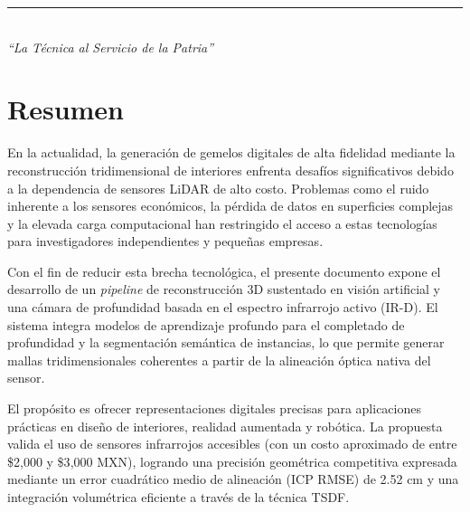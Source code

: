 \documentclass[12pt, a4, twoside, openany]{report}
\begin{document}

\vspace{1cm}

\begin{center}
    \textcolor{guindaIPN}{\rule{12cm}{0.8mm}}\\
    \Large
    \textcolor{guindaIPN}{\textit{``La Técnica al Servicio de la Patria''}}
\end{center}
\justify


\setcounter{page}{1}


\chapter*{Resumen}

En la actualidad, la generación de gemelos digitales de alta fidelidad mediante la reconstrucción tridimensional de interiores enfrenta desafíos significativos debido a la dependencia de sensores LiDAR de alto costo. Problemas como el ruido inherente a los sensores económicos, la pérdida de datos en superficies complejas y la elevada carga computacional han restringido el acceso a estas tecnologías para investigadores independientes y pequeñas empresas.

Con el fin de reducir esta brecha tecnológica, el presente documento expone el desarrollo de un \textit{pipeline} de reconstrucción 3D sustentado en visión artificial y una cámara de profundidad basada en el espectro infrarrojo activo (IR-D). El sistema integra modelos de aprendizaje profundo para el completado de profundidad y la segmentación semántica de instancias, lo que permite generar mallas tridimensionales coherentes a partir de la alineación óptica nativa del sensor.

El propósito es ofrecer representaciones digitales precisas para aplicaciones prácticas en diseño de interiores, realidad aumentada y robótica. La propuesta valida el uso de sensores infrarrojos accesibles (con un costo aproximado de entre \$2{,}000 y \$3{,}000 MXN), logrando una precisión geométrica competitiva expresada mediante un error cuadrático medio de alineación (ICP RMSE) de 2.52 cm y una integración volumétrica eficiente a través de la técnica TSDF.
\end{document}

